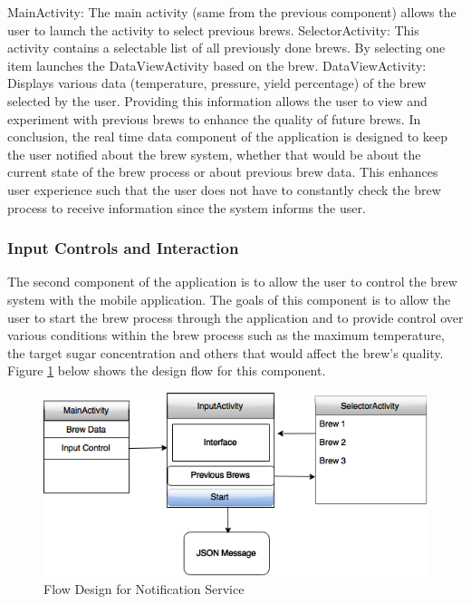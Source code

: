 \documentclass{article}
\begin{document}
MainActivity: The main activity (same from the previous component) allows the user to launch the activity to select previous brews.
SelectorActivity: This activity contains a selectable list of all previously done brews. By selecting one item launches the DataViewActivity based on the brew.
DataViewActivity: Displays various data (temperature, pressure, yield percentage) of the brew selected by the user.
Providing this information allows the user to view and experiment with previous brews to enhance the quality of future brews. 
In conclusion, the real time data component of the application is designed to keep the user notified about the brew system, whether that would be about the current state of the brew process or about previous brew data. This enhances user experience such that the user does not have to constantly check the brew process to receive information since the system informs the user.

\subsubsection{Input Controls and Interaction}
The second component of the application is to allow the user to control the brew system with the mobile application. The goals of this component is to allow the user to start the brew process through the application and to provide control over various conditions within the brew process such as the maximum temperature, the target sugar concentration and others that would affect the brew's quality. Figure \ref{fig:input-activity} below shows the design flow for this component.

\begin{figure}[H]
\begin{center}
\includegraphics[scale=0.50]{input-activity.png}
\caption{Flow Design for Notification Service}
\label{fig:input-activity}
\end{center}
\end{figure}
\end{document}
